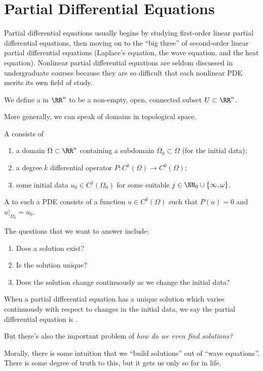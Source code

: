\chapter{Partial Differential Equations}

\begin{node}\label{pde-0000}%
Partial differential equations usually begins by studying first-order
linear partial differential equations, then moving on to the ``big
three'' of second-order linear partial differential equations (Laplace's
equation, the wave equation, and the heat equation). Nonlinear partial
differential equations are seldom discussed in undergraduate courses
because they are so difficult that each nonlinear PDE merits its own
field of study.
\end{node}

\begin{definition}\label{pde-0001}%
We define a  in $\RR^{n}$ to be a non-empty, open,
connected subset $U\subset\RR^{n}$.

More generally, we can speak of domains in topological space.
\end{definition}

\begin{definition}\label{pde-000D}%
A  consists of
\begin{enumerate}
\item a domain $\Omega\subset\RR^{n}$ containing a subdomain
  $\Omega_{0}\subset\Omega$ (for the initial data);
\item a degree $k$ differential operator $P\colon C^{k}(\Omega)\to C^{0}(\Omega)$;
\item some initial data $u_{0}\in C^{j}(\Omega_{0})$ for some suitable
  $j\in\NN_{0}\cup\{\infty,\omega\}$.
\end{enumerate}
A  to such a PDE consists of a function $u\in C^{k}(\Omega)$
such that $P(u)=0$ and $u|_{\Omega_{0}}=u_{0}$.
\end{definition}

\begin{node}\label{pde-000C}%
The questions that we want to answer include:
\begin{enumerate}
\item Does a solution exist?
\item Is the solution unique?
\item Does the solution change continuously as we change the initial data?
\end{enumerate}
When a partial differential equation has a unique solution which varies
continuously with respect to changes in the initial data, we say the
partial differential equation is .

But there's also the important problem of \emph{how do we even find solutions?}
\begin{node}\label{pde-000B}%
Morally, there is some intuition that we ``build solutions'' out of
``wave equations''. There is some degree of truth to this, but it gets
us only so far in life.
\end{node}
\end{node}


